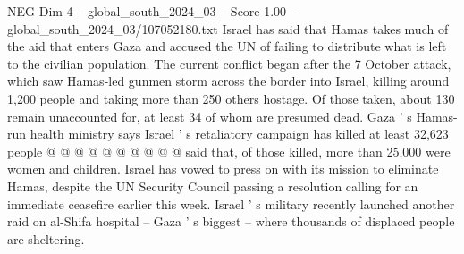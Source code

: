 \begin{textsample}{NEG Dim 4 – global\_south\_2024\_03 – Score 1.00 – global\_south\_2024\_03/107052180.txt}
Israel has said that Hamas takes much of the aid that enters Gaza and accused the UN of failing to distribute what is left to the civilian population.
The current conflict began after the 7 October attack, which saw Hamas-led gunmen storm across the border into Israel, killing around 1,200 people and taking more than 250 others hostage.
Of those taken, about 130 remain unaccounted for, at least 34 of whom are presumed dead.
Gaza ' s Hamas-run health ministry says Israel ' s retaliatory campaign has killed at least 32,623 people @ @ @ @ @ @ @ @ @ @ said that, of those killed, more than 25,000 were women and children.
Israel has vowed to press on with its mission to eliminate Hamas, despite the UN Security Council passing a resolution calling for an immediate ceasefire earlier this week.
Israel ' s military recently launched another raid on al-Shifa hospital -- Gaza ' s biggest -- where thousands of displaced people are sheltering.

\end{textsample}

